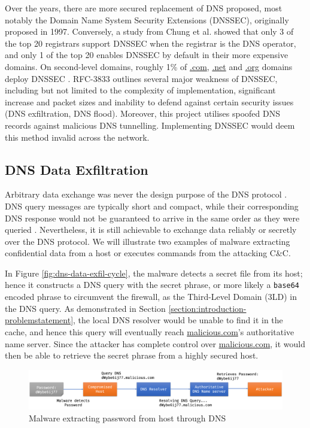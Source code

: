 \documentclass[a4paper]{report}
\newcommand{\code}{\texttt}
\begin{document}
Over the years, there are more secured replacement of DNS proposed, most notably the Domain Name System Security Extensions (DNSSEC), originally proposed in 1997\cite{RFC-2535, RFC-4033}. Conversely, a study from Chung et al. \cite{chung-2017} showed that only 3 of the top 20 registrars support DNSSEC when the registrar is the DNS operator, and only 1 of the top 20 enables DNSSEC by default in their more expensive domains. On second-level domains, roughly 1\% of \url{.com}, \url{.net} and \url{.org} domains deploy DNSSEC \cite{chung-2017-1}. RFC-3833 \cite{RFC-3833} outlines several major weakness of DNSSEC, including but not limited to the complexity of implementation, significant increase and packet sizes and inability to defend against certain security issues (DNS exfiltration, DNS flood). Moreover, this project utilises spoofed DNS records against malicious DNS tunnelling. Implementing DNSSEC would deem this method invalid across the network.

\subsection{DNS Data Exfiltration}

Arbitrary data exchange was never the design purpose of the DNS protocol \cite{nadler-201936}. DNS query messages are typically short and compact, while their corresponding DNS response would not be guaranteed to arrive in the same order as they were queried \cite{RFC-1034}. Nevertheless, it is still achievable to exchange data reliably or secretly over the DNS protocol.
We will illustrate two examples of malware extracting confidential data from a host or executes commands from the attacking C\&C. 

In Figure \ref{fig:dns-data-exfil-cycle}, the malware detects a secret file from its host; hence it constructs a DNS query with the secret phrase, or more likely a \code{base64} encoded phrase to circumvent the firewall, as the Third-Level Domain (3LD) in the DNS query. As demonstrated in Section \ref{section:introduction-problemstatement}, the local DNS resolver would be unable to find it in the cache, and hence this query will eventually reach \url{malicious.com}'s authoritative name server. Since the attacker has complete control over \url{malicious.com}, it would then be able to retrieve the secret phrase from a highly secured host.

\begin{figure}[h!]
  \includegraphics[width=\textwidth]{imgs/dns-data-exfil-out.png}
  \caption{Malware extracting password from host through DNS}
  \label{fig:dns-data-exfil-out}
\end{figure}
\end{document}

